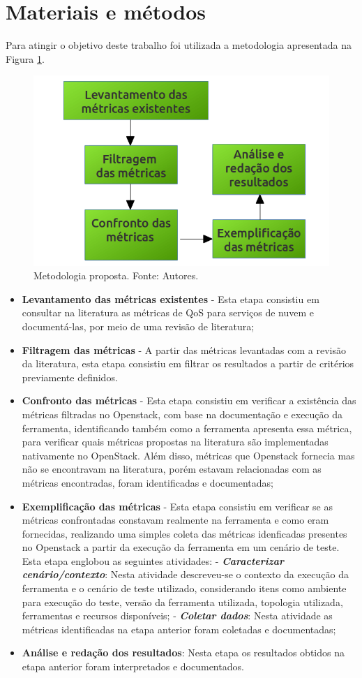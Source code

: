 \documentclass[conference]{IEEEtran}
\begin{document}
\section{Materiais e métodos}

Para atingir o objetivo deste trabalho foi utilizada a metodologia apresentada na Figura \ref{metodologia}.

\begin{figure}[ht]
  \centering
  \includegraphics[width=.3\textwidth]{figuras/metodologia.png}
  \caption{Metodologia proposta. Fonte: Autores.}
  \label{metodologia}
\end{figure}


\begin{itemize}
 \item \textbf{Levantamento das métricas existentes} - Esta etapa consistiu em consultar na literatura as métricas de QoS para
	serviços de nuvem e documentá-las, por meio de uma revisão de literatura;

 \item \textbf{Filtragem das métricas} - A partir das métricas levantadas com a revisão da literatura, esta etapa consistiu em 
	filtrar os resultados a partir de critérios previamente definidos.
	
 \item \textbf{Confronto das métricas} - Esta etapa consistiu em verificar a existência das métricas filtradas no Openstack,	
	com base na documentação e execução da ferramenta, identificando também como a ferramenta apresenta essa métrica,
	para verificar quais métricas propostas na literatura são implementadas nativamente no OpenStack. Além disso,
	métricas que Openstack fornecia mas não se encontravam na literatura, porém estavam relacionadas com as métricas encontradas,
	foram identificadas e documentadas;
 
 \item \textbf{Exemplificação das métricas} - Esta etapa consistiu em verificar se as métricas confrontadas constavam realmente na ferramenta e
	como eram fornecidas,
	realizando uma simples coleta das métricas idenficadas presentes no Openstack a partir da execução da ferramenta em um cenário de teste.
	Esta etapa englobou as seguintes atividades:
	\subitem - \emph{\textbf{Caracterizar cenário/contexto}}: Nesta atividade descreveu-se o contexto da execução da ferramenta e o cenário de teste utilizado,
		 considerando itens como ambiente para execução do teste, versão da ferramenta utilizada, topologia utilizada, ferramentas
		 e recursos disponíveis;
	\subitem - \emph{\textbf{Coletar dados}}: Nesta atividade as métricas identificadas na etapa anterior foram coletadas e documentadas;

 \item \textbf{Análise e redação dos resultados}: Nesta etapa os resultados obtidos na etapa anterior foram interpretados e documentados.
\end{itemize}
\end{document}
